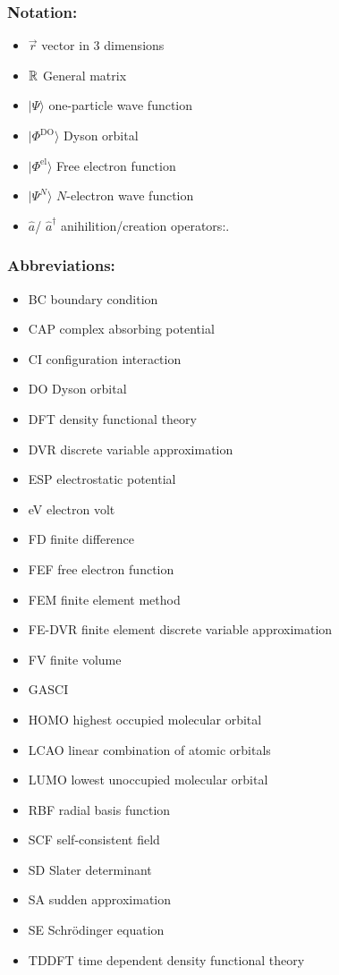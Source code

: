 \subsubsection{Notation:}
\begin{itemize}
   \item $\vec{r}$ vector in $3$ dimensions
   \item $\mathbb{R}$ General matrix
   \item $|\Psi\rangle$ one-particle wave function
   \item $|\Phi^\text{DO}\rangle$ Dyson orbital
   \item $|\Phi^\text{el}\rangle$ Free electron function
   \item $|\Psi^N\rangle$ $N$-electron wave function
   \item  $\hat{a}$/ $\hat{a}^\dagger$ anihilition/creation operators:.
\end{itemize}

\subsubsection{Abbreviations:}
\begin{itemize}
   \item BC  boundary condition
   \item CAP complex absorbing potential
   \item CI configuration interaction
   \item DO Dyson orbital
   \item DFT density functional theory
   \item DVR discrete variable approximation
   \item ESP electrostatic potential
   \item eV electron volt
   \item FD finite difference
   \item FEF free electron function
   \item FEM finite element method
   \item FE-DVR finite element discrete variable approximation
   \item FV finite volume
   \item GASCI 
   \item HOMO highest occupied molecular orbital
   \item LCAO linear combination of atomic orbitals
   \item LUMO lowest unoccupied molecular orbital
   \item RBF radial basis function
   \item SCF self-consistent field
   \item SD Slater determinant
   \item SA sudden approximation
   \item SE Schr\"odinger equation
   \item TDDFT time dependent density functional theory
\end{itemize}
